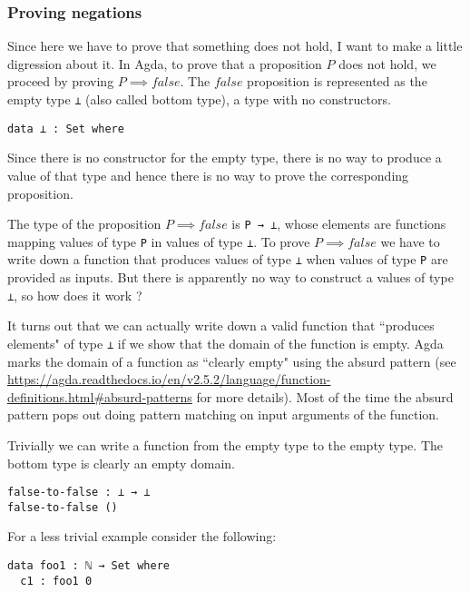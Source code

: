 \documentclass{article}
\begin{document}
\begin{tcolorbox}[breakable, enhanced, parbox=false]
\subsubsection*{Proving negations}

Since here we have to prove that something does not hold, I want to make a little digression about it.
In Agda, to prove that a proposition $P$ does not hold, we proceed by proving $P \implies false$.
The $false$ proposition is represented as the empty type \texttt{⊥} (also called bottom type), a type with no constructors.

\begin{verbatim}
data ⊥ : Set where
\end{verbatim}

Since there is no constructor for the empty type, there is no way to produce a value of that type and hence there is no way to prove the corresponding proposition.

The type of the proposition $P \implies false$ is \texttt{P → ⊥}, whose elements are functions mapping values of type \texttt{P} in values of type \texttt{⊥}.
To prove $P \implies false$ we have to write down a function that produces values of type \texttt{⊥} when values of type \texttt{P} are provided as inputs.
But there is apparently no way to construct a values of type \texttt{⊥}, so how does it work ?

It turns out that we can actually write down a valid function that ``produces elements" of type \texttt{⊥} if we show that the domain of the function is empty.
Agda marks the domain of a function as ``clearly empty" using the absurd pattern (see \url{https://agda.readthedocs.io/en/v2.5.2/language/function-definitions.html#absurd-patterns} for more details).
Most of the time the absurd pattern pops out doing pattern matching on input arguments of the function.

Trivially we can write a function from the empty type to the empty type.
The bottom type is clearly an empty domain.

\begin{verbatim}
false-to-false : ⊥ → ⊥
false-to-false ()
\end{verbatim}

For a less trivial example consider the following:
\begin{verbatim}
data foo1 : ℕ → Set where
  c1 : foo1 0


\end{verbatim}
\end{tcolorbox}
\end{document}
